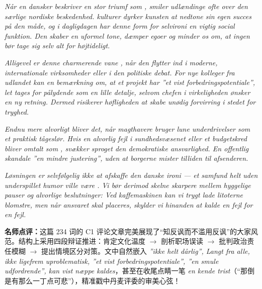 \begin{answerbox}
\textit{Når en dansker beskriver en stor triumf som , smiler udlændinge ofte over den særlige nordiske beskedenhed.  kulturer dyrker kunsten at nedtone sin egen succes på den måde, og i dagligdagen har denne form for selvironi en vigtig social funktion. Den skaber en uformel tone, dæmper egoer og minder os om, at ingen bør tage sig selv alt for højtideligt.}

\textit{Alligevel er denne charmerende vane , når den flytter ind i moderne, internationale virksomheder eller i den politiske debat. For nye kolleger fra udlandet kan en bemærkning om, at et projekt har ”et vist forbedringspotentiale”, let tages for pålydende som en lille detalje, selvom chefen i virkeligheden ønsker en ny retning. Dermed risikerer høfligheden at skabe unødig forvirring i stedet for tryghed.}

\textit{Endnu mere alvorligt bliver det, når magthavere bruger lune underdrivelser som et praktisk tågeslør. Hvis en alvorlig fejl i sundhedsvæsenet eller et budgetskred bliver omtalt som , svækker sproget den demokratiske ansvarlighed. En offentlig skandale  ”en mindre justering”, uden at borgerne mister tilliden til afsenderen.}

\textit{Løsningen er selvfølgelig ikke at afskaffe den danske ironi --- et samfund helt uden underspillet humor ville være . Vi bør derimod skelne skarpere mellem hyggelige pauser og alvorlige beslutninger: Ved kaffemaskinen kan vi trygt lade litoterne blomstre, men når ansvaret skal placeres, skylder vi hinanden at kalde en fejl for en fejl.}

\small\textbf{名师点评：}这篇 234 词的 C1 评论文章完美展现了“知反讽而不滥用反讽”的大家风范。结构上采用四段辩证推进：肯定文化温度 $\rightarrow$ 剖析职场误读 $\rightarrow$ 批判政治责任模糊 $\rightarrow$ 提出情境区分对策。文中自然嵌入 \textit{”ikke helt dårlig”, Langt fra alle, ikke ligefrem uproblematisk, ”et vist forbedringspotentiale”, ”en smule udfordrende”, kan vist næppe kaldes}，甚至在收尾点睛一笔 \textit{en kende trist}（“那倒是有那么一丁点可悲”），精准戳中丹麦评委的审美心弦！
\end{answerbox}
